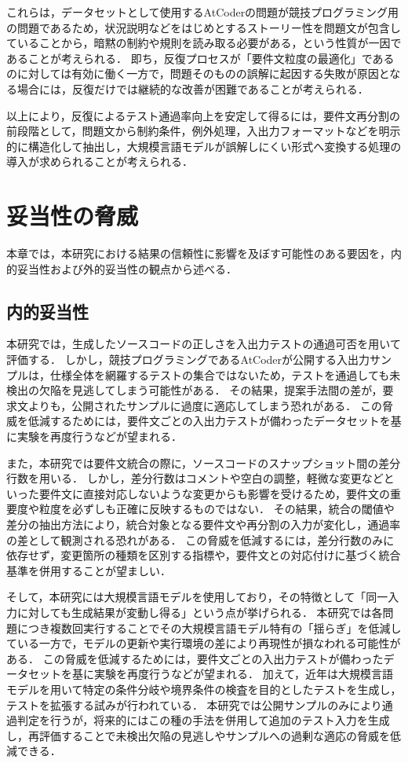 \documentclass[11pt]{jreport}
\begin{document}
これらは，データセットとして使用するAtCoderの問題が競技プログラミング用の問題であるため，状況説明などをはじめとするストーリー性を問題文が包含していることから，暗黙の制約や規則を読み取る必要がある，という性質が一因であることが考えられる．
即ち，反復プロセスが「要件文粒度の最適化」であるのに対しては有効に働く一方で，問題そのものの誤解に起因する失敗が原因となる場合には，反復だけでは継続的な改善が困難であることが考えられる．

以上により，反復によるテスト通過率向上を安定して得るには，要件文再分割の前段階として，問題文から制約条件，例外処理，入出力フォーマットなどを明示的に構造化して抽出し，大規模言語モデルが誤解しにくい形式へ変換する処理の導入が求められることが考えられる．


\chapter{妥当性の脅威}
本章では，本研究における結果の信頼性に影響を及ぼす可能性のある要因を，内的妥当性および外的妥当性の観点から述べる．

\section{内的妥当性}
本研究では，生成したソースコードの正しさを入出力テストの通過可否を用いて評価する．
しかし，競技プログラミングであるAtCoderが公開する入出力サンプルは，仕様全体を網羅するテストの集合ではないため，テストを通過しても未検出の欠陥を見逃してしまう可能性がある．
その結果，提案手法間の差が，要求文よりも，公開されたサンプルに過度に適応してしまう恐れがある．
この脅威を低減するためには，要件文ごとの入出力テストが備わったデータセットを基に実験を再度行うなどが望まれる．

また，本研究では要件文統合の際に，ソースコードのスナップショット間の差分行数を用いる．
しかし，差分行数はコメントや空白の調整，軽微な変更などといった要件文に直接対応しないような変更からも影響を受けるため，要件文の重要度や粒度を必ずしも正確に反映するものではない．
その結果，統合の閾値や差分の抽出方法により，統合対象となる要件文や再分割の入力が変化し，通過率の差として観測される恐れがある．
この脅威を低減するには，差分行数のみに依存せず，変更箇所の種類を区別する指標や，要件文との対応付けに基づく統合基準を併用することが望ましい．

そして，本研究には大規模言語モデルを使用しており，その特徴として「同一入力に対しても生成結果が変動し得る」という点が挙げられる．
本研究では各問題につき複数回実行することでその大規模言語モデル特有の「揺らぎ」を低減している一方で，モデルの更新や実行環境の差により再現性が損なわれる可能性がある．
この脅威を低減するためには，要件文ごとの入出力テストが備わったデータセットを基に実験を再度行うなどが望まれる．
加えて，近年は大規模言語モデルを用いて特定の条件分岐や境界条件の検査を目的としたテストを生成し，テストを拡張する試みが行われている\cite{Expand_Test}．
本研究では公開サンプルのみにより通過判定を行うが，将来的にはこの種の手法を併用して追加のテスト入力を生成し，再評価することで未検出欠陥の見逃しやサンプルへの過剰な適応の脅威を低減できる．
\end{document}
